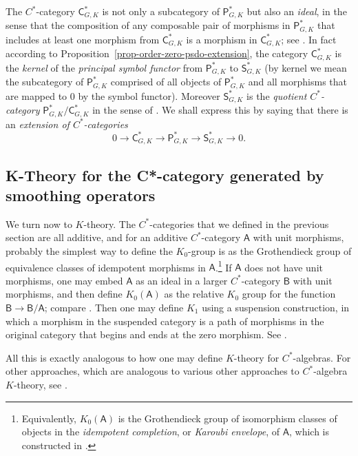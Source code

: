 \documentclass[leqno,11pt]{amsart}
\numberwithin{equation}{subsection}
\theoremstyle{plain}
\theoremstyle{definition}
\theoremstyle{remark}
\newcommand{\PSDO}{\mathsf{P}}
\newcommand{\CC}{\mathsf{C}}
\newcommand{\Symb}{\mathsf{S}}
\begin{document}
The $C^*$-category $\CC^{*}_{G,K}$ is not only a subcategory of $\PSDO^*_{G,K}$ but also an \emph{ideal}, in the sense that the composition of any composable pair of morphisms in $\PSDO^*_{G,K}$ that includes at least one morphism from $\CC^{*}_{G,K}$ is a morphism in $\CC^{*}_{G,K}$; see \cite[Def.\,4.2]{MitchenerCategories02}.  In fact according to Proposition~\ref{prop-order-zero-psdo-extension}, the category $\CC^*_{G,K}$  is the \emph{kernel}  of the \emph{principal symbol functor} from $\PSDO^*_{G,K}$ to $\Symb^*_{G,K}$ (by kernel we mean the subcategory of $\PSDO^*_{G,K}$ comprised of all objects of $\PSDO^*_{G,K}$ and all morphisms that are mapped to $0$ by the symbol functor). Moreover $\Symb^*_{G,K}$ is the \emph{quotient $C^*$-category} $\PSDO^*_{G,K} / \CC^{*}_{G,K}$  in the sense of \cite[Def.\,4.4]{MitchenerCategories02}. We shall express this by saying that there is  an \emph{extension of $C^*$-categories}
\[
0 \longrightarrow \CC^{*}_{G,K} \longrightarrow \PSDO^{*}_{G,K} \longrightarrow \Symb^{*}_{G,K} \longrightarrow 0.
\]
 


\subsection{K-Theory for the   C*-category generated by smoothing operators} 
\label{subsec-k-theory-for-smoothing-category}
We turn now to $K$-theory. The $C^*$-categories that we defined in the previous section are all additive, and for an additive $C^*$-category $\mathsf A$ with unit morphisms, probably the simplest way to define the $K_0$-group is as the Grothendieck group of equivalence classes of idempotent morphisms in $\mathsf A$.\footnote{Equivalently,   $K_0(\mathsf{A})$ is the Grothendieck group of isomorphism classes of objects in the \emph{idempotent completion}, or \emph{Karoubi envelope}, of $\mathsf A$, which is constructed in \cite[Thm.\,I.6.10]{KaroubiKTheory}.}  If $\mathsf A$ does not have unit morphisms, one may embed $\mathsf A$ as an ideal in a larger $C^*$-category $\mathsf B$ with unit morphisms, and then define $K_0(\mathsf {A})$ as the relative $K_0$ group for the function $\mathsf{B}\to \mathsf{B}/\mathsf{A}$; compare \cite[Sec.\,II.2]{KaroubiKTheory}. Then one may define $K_1$ using a suspension construction, in which a morphism in the suspended category is a path of morphisms in the original category that begins and ends at the zero morphism. See \cite[Sec.\,II.3]{KaroubiKTheory}.

All this is exactly analogous to how one may define $K$-theory for $C^*$-algebras.  For other approaches, which are analogous to various other approaches to $C^*$-algebra $K$-theory, see \cite{MitchenerKTheory01,Mitchener02,Joachim03}.
\end{document}
